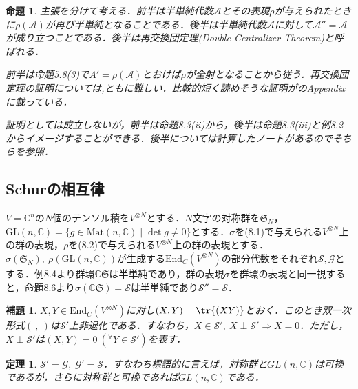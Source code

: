 \documentclass[dvipdfmx]{jsarticle}
\newtheorem{theorem}{定理}[section]%
\newtheorem{prop}{命題}[section]
\newtheorem{lemma}{補題}[section]
\begin{document}
\begin{prop}
主張を分けて考える．前半は半単純代数$\mathscr{A}$とその表現$\rho$が与えられたときに$\rho(\mathscr{A})$が再び半単純となることである．後半は半単純代数$\mathscr{A}$に対して$\mathscr{A}''=\mathscr{A}$が成り立つことである．後半は再交換団定理(Double Centralizer Theorem)と呼ばれる．\par
前半は\cite{okada}命題5.8(3)で$A'=\rho(\mathscr{A})$とおけば$\rho$が全射となることから従う．再交換団定理の証明については\cite{iwahori},\cite{okada}ともに難しい．比較的短く読めそうな証明が\cite{URL3}のAppendixに載っている．\par
証明としては成立しないが，前半は命題8.3(ii)から，後半は命題8.3(iii)と例8.2からイメージすることができる．後半については計算したノートがあるのでそちらを参照．
\end{prop}
%
%
%
%
\subsection*{Schurの相互律}
$V=\mathbb{C}^n$の$N$個のテンソル積を$V^{\otimes N}$とする．$N$文字の対称群を$\mathfrak{S}_N$，$\mathrm{GL}(n,\mathbb{C})=\{g\in \mathrm{Mat}(n,\mathbb{C})\mid \det{g}\neq 0\}$とする．$\sigma$を(8.1)で与えられる$V^{\otimes N}$上の群の表現，$\rho$を(8.2)で与えられる$V^{\otimes N}$上の群の表現とする．$\sigma(\mathfrak{S}_N),{\ }\rho(\mathrm{GL}(n,\mathbb{C}))$が生成する$\mathrm{End}_C(V^{\otimes N})$の部分代数をそれぞれ$\mathscr{S},\mathscr{G}$とする．例8.4より群環$\mathbb{C}\mathfrak{S}$は半単純であり，群の表現$\sigma$を群環の表現と同一視すると，命題8.6より$\sigma(\mathbb{C}\mathfrak{S})=\mathscr{S}$は半単純であり$\mathscr{S}''=\mathscr{S}$．
%
%
%
%
\setcounter{section}{8}
\setcounter{lemma}{7}
\begin{lemma}
$X,Y\in\mathrm{End}_C(V^{\otimes N})$に対し$(X,Y)=\tr{(XY)}$とおく．このとき双一次形式$({\ },{\ })$は$\mathscr{S}'$上非退化である．すなわち，$X\in\mathscr{S}',{\ }X\perp\mathscr{S}'\Longrightarrow X=0$．ただし，$X\perp \mathscr{S}'$は$(X,Y)=0{\ }( ^\forall Y\in\mathscr{S}')$を表す．
\end{lemma}
%
%
%
%
\setcounter{theorem}{6}
\begin{theorem}
$\mathscr{S}'=\mathscr{G},{\ }\mathscr{G}'=\mathscr{S}$．すなわち標語的に言えば，対称群と$GL(n,\mathbb{C})$は可換であるが，さらに対称群と可換であれば$GL(n,\mathbb{C})$である．
\end{theorem}
\end{document}
